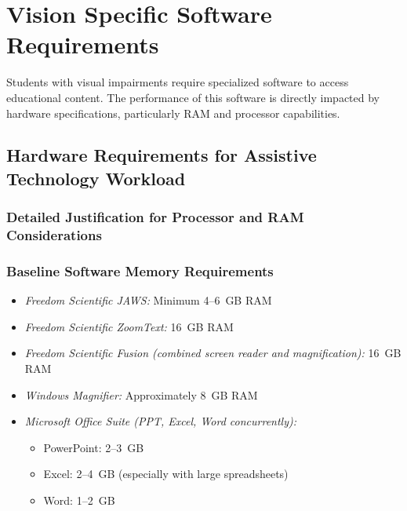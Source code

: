 \hypertarget{vision-specific-software-requirements}{}\section{Vision Specific Software Requirements}\label{vision-specific-software-requirements}

Students with visual impairments require specialized software to access educational content. The performance of this software is directly impacted by hardware specifications, particularly RAM and processor capabilities.

\subsection{Hardware Requirements for Assistive Technology Workload}\label{hardware-justification-ai-ram}

\subsubsection{Detailed Justification for Processor and RAM Considerations}

\subsubsection{Baseline Software Memory Requirements}

\begin{itemize}
	\item \emph{Freedom Scientific JAWS:} Minimum 4--6~GB RAM \supercite{FreedomScientificJAWSRequirements}
	\item \emph{Freedom Scientific ZoomText:} 16~GB RAM \supercite{FreedomScientificZoomTextRequirements}
	\item \emph{Freedom Scientific Fusion (combined screen reader and magnification):} 16~GB RAM \supercite{FreedomScientificFusionRequirements}
	\item \emph{Windows Magnifier:} Approximately 8~GB RAM \supercite{MicrosoftWindowsAccessibility}
	\item \emph{Microsoft Office Suite (PPT, Excel, Word concurrently):} \supercite{MicrosoftOfficeSystemRequirements}

	      \begin{itemize}
		      \item PowerPoint: 2--3~GB
		      \item Excel: 2--4~GB (especially with large spreadsheets)
		      \item Word: 1--2~GB
	      \end{itemize}

\end{itemize}


